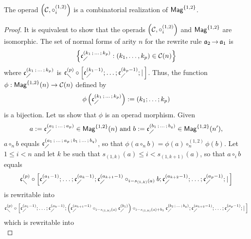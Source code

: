 \begin{Proposition} \label{prop:Realisation_Mag_1_2}
    The operad $\left(\mathcal{C}, \circ_i^{(1,2)}\right)$ is a
    combinatorial realization of $\mathsf{Mag}^{\{1, 2\}}$.
\end{Proposition}
\begin{proof}
  It is equivalent to show that the operads
  $\left(\mathcal{C}, \circ_i^{(1,2)}\right)$ and $\mathsf{Mag}^{\{1, 2\}}$ 
  are
  isomorphic. The set of normal forms of arity $n$ for the rewrite rule
  $\mathfrak{a}_2 \operatorname{\to} \mathfrak{a}_1$ is
\begin{equation} \label{equ:Normal_forms_A2}
\left\{ \mathfrak{c}^{\left(k_1 \, ; \, \dots \, ; \, k_p\right)}_{\diagup} :
\left(k_1, \dots, k_p\right) \in \mathcal{C}(n) \right\}
\end{equation}
where $\mathfrak{c}^{\left(k_1 \, ; \, \dots \, ; \, k_p\right)}_{\diagup}$ is
$\mathfrak{c}^{\left(p\right)}_{\diagdown} \circ \left[\mathfrak{c}^{\left(k_1-1\right)}_{\diagup}; \dots ; \mathfrak{c}^{\left(k_p-1\right)}_{\diagup}
; | \, \right]$.
Thus, the function
$\phi : \mathsf{Mag}^{\{1, 2\}}(n) \rightarrow \mathcal{C}(n)$ defined by
\begin{equation} \label{equ:Morphism_A2}
\phi\left( \mathfrak{c}^{\left(k_1 \, ; \, \dots \, ; \, k_p\right)}_{\diagup} \right) :=
\left(k_1 ; \dots ; k_p  \right)
\end{equation}
is a bijection. Let us show that $\phi$ is an operad morphism. Given
\begin{equation}
  a := \mathfrak{c}^{\left(a_1 \, ; \, \dots \, ; \, a_p\right)}_{\diagup} \in \mathsf{Mag}^{\{1, 2\}}(n)
  \text{ and }
  b := \mathfrak{c}^{\left(b_1 \, ; \, \dots \, ; \, b_q\right)}_{\diagup} \in \mathsf{Mag}^{\{1, 2\}}(n'),
\end{equation}
$a \circ_n b$ equals $\mathfrak{c}^{\left(a_1 \, ; \, \dots \, ; \, a_p
 \, ; \, b_1 \, ; \, \dots \, ; \, b_q\right)}_{\diagup}$, so that
 $\phi\left(a \circ_n b\right) = \phi\left(a\right) \circ_n^{(1,2)}
 \phi\left(b\right)$. Let $1 \leq i < n$ and let $k$ be such that
 $s_{(1, k)}(a) \leq i < s_{(1, k+1)}(a)$, so that $a \circ_i b$ equals
\begin{equation} \label{equ:Rewriting_1_Mag_1_2}
\mathfrak{c}^{\left(p\right)}_{\diagdown} \circ \left[\mathfrak{c}^{\left(a_1-1\right)}_{\diagup}; \dots ; \mathfrak{c}^{\left(a_k-1\right)}_{\diagup};
\mathfrak{c}^{\left(a_{k+1}-1\right)}_{\diagup}
\circ_{i-s_{(1,k)}(a)} b  ; \mathfrak{c}^{\left(a_{k+2}-1\right)}_{\diagup} ; \dots; \mathfrak{c}^{\left(a_p-1\right)}_{\diagup} ;
| \, \right]
\end{equation}
is rewritable into
\begin{equation}
\mathfrak{c}^{\left(p\right)}_{\diagdown} \circ \left[\mathfrak{c}^{\left(a_1-1\right)}_{\diagup}; \dots ; \mathfrak{c}^{\left(a_k-1\right)}_{\diagup}; \left(
\mathfrak{c}^{\left(a_{k+1}-1\right)}_{\diagup} \circ_{i-s_{(1,k)}(a)}  \mathfrak{c}^{\left(b_1\right)}_{\diagup} \right)
\circ_{i-s_{(1,k)}(a)+b_1} \mathfrak{c}^{\left(b_2 \, ; \, \dots \, ; \, b_q\right)}_{\diagup} ;
\mathfrak{c}^{\left(a_{k+2}-1\right)}_{\diagup} ; \dots; \mathfrak{c}^{\left(a_p-1\right)}_{\diagup} ; | \, \right]
\end{equation}
which is rewritable into
\begin{equation} \label{equ:Rewriting_2_Mag_1_2}

\end{equation}
\end{proof}
